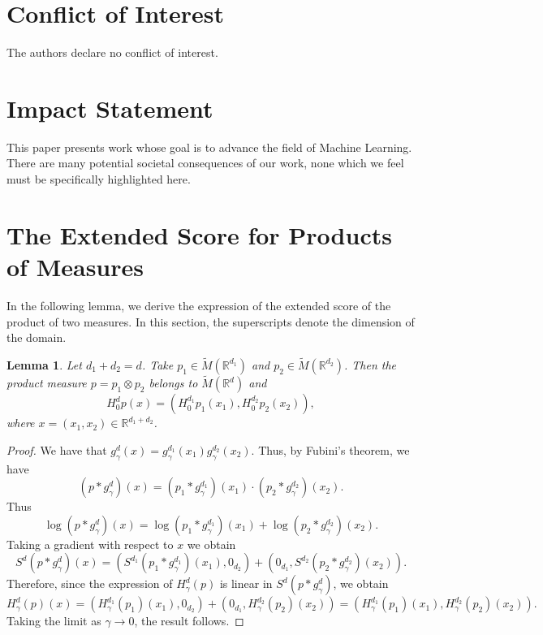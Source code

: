 \documentclass{article}
\newcommand{\R}{\mathbb{R}}
\theoremstyle{plain}
\newtheorem{lemma}[theorem]{Lemma}
\theoremstyle{definition}
\theoremstyle{remark}
\begin{document}
\section*{Conflict of Interest}
The authors declare no conflict of interest.

\section*{Impact Statement}
This paper presents work whose goal is to advance the field of Machine Learning. There are many potential societal consequences of our work, none which we feel must be specifically highlighted here.




\newpage
\appendix
\onecolumn


\section{The Extended Score for Products of Measures}\label{sec:product}

In the following lemma, we derive the expression of the extended score of the product of two measures. In this section, the superscripts denote the dimension of the domain.

\begin{lemma}\label{lem:score-product}
    Let $d_1+d_2=d$. Take $p_1\in \widetilde{M}(\R^{d_1})$  and $p_2\in \widetilde{M}(\R^{d_2})$. Then the product measure $p=p_1\otimes p_2$ belongs to $\widetilde{M}(\R^{d})$ and
    \[
H^d_0 p(x)=(H^{d_1}_0 p_1(x_1),H_0^{d_2} p_2(x_2)),
    \]
    where $x=(x_1,x_2)\in \R^{d_1+d_2}$.
\end{lemma}
\begin{proof}
  We have that $g_\gamma^d (x) = g_\gamma^{d_1}(x_1)g_\gamma^{d_2}(x_2)$. Thus, by Fubini's theorem, we have
  \[
(p*g^d_\gamma)(x) = (p_1*g^{d_1}_\gamma)(x_1)\cdot (p_2*g^{d_2}_\gamma)(x_2).
  \]
  Thus
    \[
\log (p*g^d_\gamma)(x) =\log  (p_1*g^{d_1}_\gamma)(x_1)+\log (p_2*g^{d_2}_\gamma)(x_2).
  \]
  Taking a gradient with respect to $x$ we obtain
  \[
  S^d(p*g^d_\gamma)(x) = (S^{d_1}(p_1*g^{d_1}_\gamma)(x_1),0_{d_2})+(0_{d_1},S^{d_2}(p_2*g^{d_2}_\gamma)(x_2)).
  \]
  Therefore, since the expression of $H^d_\gamma (p)$ is linear in $S^d(p*g^d_\gamma)$, we obtain
\[
H^d_\gamma (p)(x) =( H^{d_1}_\gamma (p_1)(x_1),0_{d_2})+(0_{d_1},H^{d_2}_\gamma (p_2)(x_2))=( H^{d_1}_\gamma (p_1)(x_1),H^{d_2}_\gamma (p_2)(x_2)).
\]
Taking the limit as $\gamma\to 0$, the result follows.
\end{proof}
\end{document}
